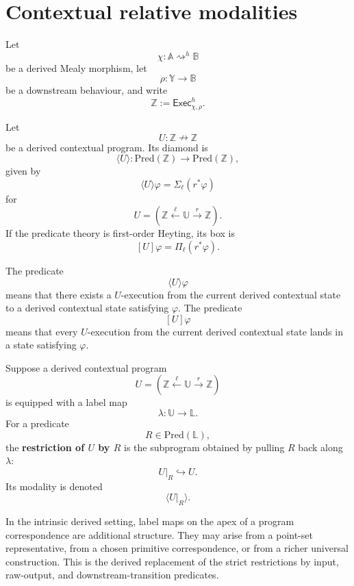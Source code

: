 \section{Contextual relative modalities}
\label{sec:contextual-relative-modalities-derived}

Let
\[
\chi:\mathbb A\rightsquigarrow^h\mathbb B
\]
be a derived Mealy morphism, let
\[
\rho:\mathbb Y\to\mathbb B
\]
be a downstream behaviour, and write
\[
\mathbb Z
:=
\mathsf{Exec}^h_{\chi,\rho}.
\]

\begin{definition}
\label{def:derived-contextual-modality}
Let
\[
U:\mathbb Z\nrightarrow\mathbb Z
\]
be a derived contextual program. Its diamond is
\[
\langle U\rangle:
\mathrm{Pred}(\mathbb Z)\to\mathrm{Pred}(\mathbb Z),
\]
given by
\[
\langle U\rangle\varphi
=
\Sigma_\ell(r^\ast\varphi)
\]
for
\[
U=(\mathbb Z\xleftarrow{\ell}\mathbb U\xrightarrow{r}\mathbb Z).
\]
If the predicate theory is first-order Heyting, its box is
\[
[U]\varphi
=
\Pi_\ell(r^\ast\varphi).
\]
\end{definition}

\begin{remark}[Interpretation]
\label{rem:contextual-modality-interpretation}
The predicate
\[
\langle U\rangle\varphi
\]
means that there exists a \(U\)-execution from the current derived contextual
state to a derived contextual state satisfying \(\varphi\). The predicate
\[
[U]\varphi
\]
means that every \(U\)-execution from the current derived contextual state
lands in a state satisfying \(\varphi\).
\end{remark}

\begin{definition}
\label{def:label-restricted-derived-subprogram}
Suppose a derived contextual program
\[
U=(\mathbb Z\xleftarrow{\ell}\mathbb U\xrightarrow{r}\mathbb Z)
\]
is equipped with a label map
\[
\lambda:\mathbb U\to\mathbb L.
\]
For a predicate
\[
R\in\mathrm{Pred}(\mathbb L),
\]
the \textbf{restriction of \(U\) by \(R\)} is the subprogram obtained by
pulling \(R\) back along \(\lambda\):
\[
U|_R
\hookrightarrow
U.
\]
Its modality is denoted
\[
\langle U|_R\rangle.
\]
\end{definition}

\begin{remark}
\label{rem:label-maps-not-automatic-derived}
In the intrinsic derived setting, label maps on the apex of a program
correspondence are additional structure. They may arise from a point-set
representative, from a chosen primitive correspondence, or from a richer
universal construction. This is the derived replacement of the strict
restrictions by input, raw-output, and downstream-transition predicates.
\end{remark}

